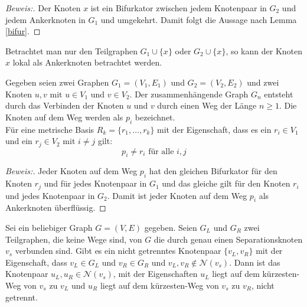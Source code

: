 \begin{proof}[Beweis:]
Der Knoten $x$ ist ein Bifurkator zwischen jedem Knotenpaar in $G_2$ und jedem Ankerknoten in $G_1$ und umgekehrt. Damit folgt die Aussage nach Lemma \ref{bifur}.
\end{proof}
Betrachtet man nur den Teilgraphen $G_1 \cup \{x\}$ oder $G_2 \cup \{x\}$, so kann der Knoten $x$ lokal als Ankerknoten betrachtet werden. 
\begin{lem}
\label{keinknotenvonwegindermd}
Gegeben seien zwei Graphen $G_1=(V_1,E_1)$ und $G_2=(V_2,E_2)$ und zwei Knoten $u,v$ mit $u \in V_1$ und $v \in V_2$.
Der zusammenhängende Graph $G_n$ entsteht durch das Verbinden der Knoten $u$ und $v$ durch einen Weg der Länge $n \geq 1$. Die Knoten auf dem Weg werden als $p_i$ bezeichnet.\\
Für eine metrische Basis $R_k= \{ r_1, \ldots , r_k \}$ mit der Eigenschaft, dass es ein $r_i \in V_1$ und ein $r_j \in V_2$  mit $i \neq j$ gilt:
\[p_i \neq r_i \text{ für alle } i,j\]
\end{lem}
\begin{proof}[Beweis:]
Jeder Knoten auf dem Weg $p_i$ hat den gleichen Bifurkator für den Knoten $r_j$ und für jedes Knotenpaar in $G_1$ und das gleiche gilt für den Knoten $r_i$ und jedes Knotenpaar in $G_2$. Damit ist jeder Knoten auf dem Weg $p_i$ als Ankerknoten überflüssig.
\end{proof}
\begin{lem}
\label{nachbartrennungsknoten}
Sei ein beliebiger Graph $G=(V,E)$ gegeben. Seien $G_L$ und $G_R$ zwei Teilgraphen, die keine Wege sind, von $G$ die durch genau einen Separationsknoten $v_s$ verbunden sind. Gibt es ein nicht getrenntes Knotenpaar $\{v_L,v_R\}$ mit der Eigenschaft, dass $v_L\in G_L$ und $v_R \in G_R$ und $v_L, v_R \notin \mathcal{N}(v_s)$.\newline
Dann ist das Knotenpaar $u_L,u_R \in \mathcal{N}(v_s)$, mit der Eigenschaften $u_L$ liegt auf dem kürzesten-Weg von $v_s$ zu $v_L$ und $u_R$ liegt auf dem kürzesten-Weg von $v_s$ zu $v_R$, nicht getrennt.
\end{lem}
